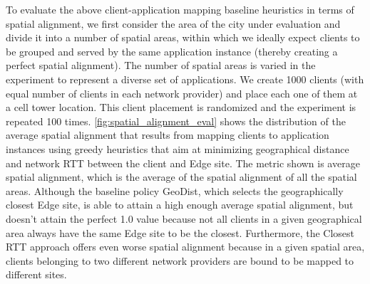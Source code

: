To evaluate the above client-application mapping baseline heuristics in terms of spatial alignment, we first consider the area of the city under evaluation and divide it into a number of spatial areas, within which we ideally expect clients to be grouped and served by the same application instance (thereby creating a perfect spatial alignment). The number of spatial areas is varied in the experiment to represent a diverse set of applications. We create 1000 clients (with equal number of clients in each network provider) and place each one of them at a cell tower location. This client placement is randomized and the experiment is repeated 100 times. \cref{fig:spatial_alignment_eval} shows the distribution of the average spatial alignment that results from mapping clients to application instances using greedy heuristics that aim at minimizing geographical distance and network RTT between the client and Edge site. The metric shown is average spatial alignment, which is the average of the spatial alignment of all the spatial areas. Although the baseline policy GeoDist, which selects the geographically closest Edge site, is able to attain a high enough average spatial alignment, but doesn't attain the perfect 1.0 value because not all clients in a given geographical area always have the same Edge site to be the closest. Furthermore, the Closest RTT approach offers even worse spatial alignment because in a given spatial area, clients belonging to two different network providers are bound to be mapped to different sites. 

